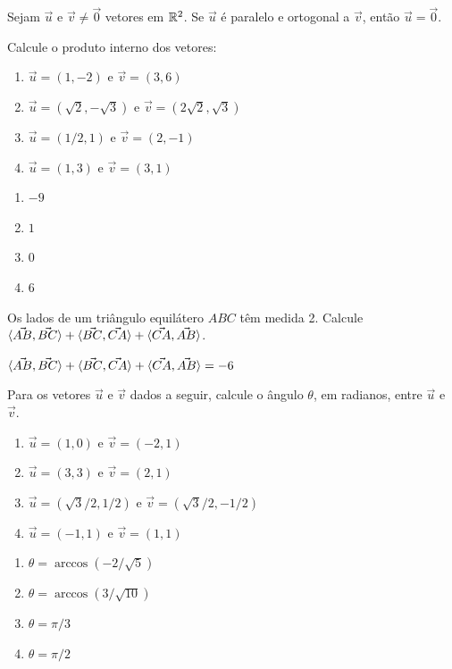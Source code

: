 \documentclass[12pt]{exam}
\begin{document}
\vspace{.3cm}

\questao{} Sejam $\vec{u}$ e $\vec{v} \ne \vec{0}$ vetores em $\mathbb{R}^2$. Se $\vec{u}$ é paralelo e ortogonal a $\vec{v}$, então $\vec{u} = \vec{0}$.

\vspace{.3cm}

\questao{} Calcule o produto interno dos vetores:
\begin{enumerate}[label=({\alph*})]
    \item $\vec{u} = (1, -2)$ e $\vec{v} = (3, 6)$
    \item $\vec{u} = (\sqrt{2}, -\sqrt{3})$ e $\vec{v} = (2\sqrt{2}, \sqrt{3})$
    \item $\vec{u} = (1/2, 1)$ e $\vec{v} = (2, -1)$
    \item $\vec{u} = (1, 3)$ e $\vec{v} = (3, 1)$
\end{enumerate}
\begin{solucao}
    \begin{enumerate}[label=({\alph*})]
        \item $-9$
        \item $1$
        \item $0$
        \item $6$
    \end{enumerate}
\end{solucao}

\vspace{.3cm}

\questao{} Os lados de um triângulo equilátero $ABC$ têm medida 2. Calcule $\langle \vec{AB}, \vec{BC} \rangle + \langle \vec{BC}, \vec{CA} \rangle + \langle \vec{CA}, \vec{AB} \rangle$.
\begin{solucao}
    $\langle \vec{AB}, \vec{BC} \rangle + \langle \vec{BC}, \vec{CA} \rangle + \langle \vec{CA}, \vec{AB} \rangle = -6$
\end{solucao}

\vspace{.3cm}

\questao{} Para os vetores $\vec{u}$ e $\vec{v}$ dados a seguir, calcule o ângulo $\theta$, em radianos, entre $\vec{u}$ e $\vec{v}$.
\begin{enumerate}[label=({\alph*})]
    \item $\vec{u} = (1, 0)$ e $\vec{v} = (-2, 1)$
    \item $\vec{u} = (3, 3)$ e $\vec{v} = (2, 1)$
    \item $\vec{u} = (\sqrt{3}/2, 1/2)$ e $\vec{v} = (\sqrt{3}/2, -1/2)$
    \item $\vec{u} = (-1, 1)$ e $\vec{v} = (1, 1)$
\end{enumerate}
\begin{solucao}
    \begin{enumerate}[label=({\alph*})]
        \item $\theta = \arccos(-2/\sqrt{5})$
        \item $\theta = \arccos(3/\sqrt{10})$
        \item $\theta = \pi/3$
        \item $\theta = \pi/2$
    \end{enumerate}
\end{solucao}
\end{document}
